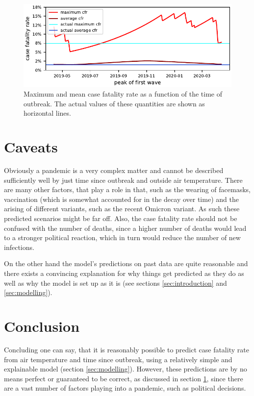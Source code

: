\documentclass{article}
\begin{document}
\begin{figure}[hbt!]
  \begin{center}
    \includegraphics{../fig/MaxMeanCfr.pdf}
    \caption{Maximum and mean case fatality rate as a function of the time of outbreak. The actual values of these quantities are shown as horizontal lines.}
    \label{fig:max_mean_cfr}
  \end{center}
\end{figure}

\section{Caveats}
\label{sec:caveats}

Obviously a pandemic is a very complex matter and cannot be described sufficiently well by just time since outbreak and outside air temperature. There are many other factors, that play a role in that, such as the wearing of facemasks, vaccination (which is somewhat accounted for in the decay over time) and the arising of different variants, such as the recent Omicron variant. As such these predicted scenarios might be far off. Also, the case fatality rate should not be confused with the number of deaths, since a higher number of deaths would lead to a stronger political reaction, which in turn would reduce the number of new infections. 

On the other hand the model's predictions on past data are quite reasonable and there exists a convincing explanation for why things get predicted as they do as well as why the model is set up as it is (see sections \ref{sec:introduction} and \ref{sec:modelling}).

\section{Conclusion}

Concluding one can say, that it is reasonably possible to predict case fatality rate from air temperature and time since outbreak, using a relatively simple and explainable model (section \ref{sec:modelling}). However, these predictions are by no means perfect or guaranteed to be correct, as discussed in section \ref{sec:caveats}, since there are a vast number of factors playing into a pandemic, such as political decisions. 
\end{document}
